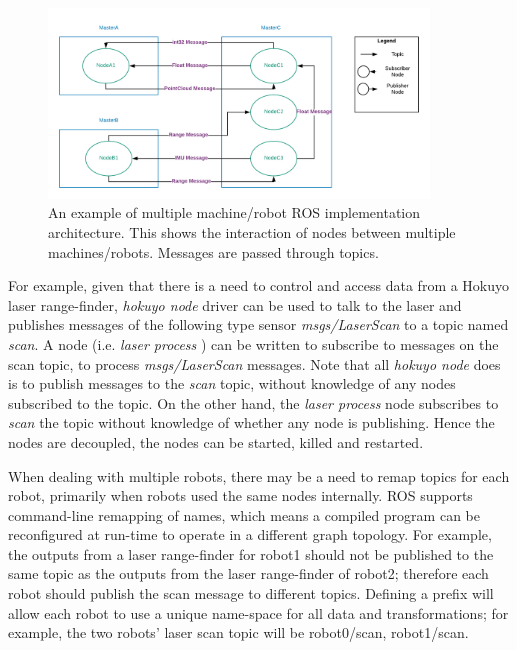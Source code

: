 \begin{figure}[H]
    \centering
    \includegraphics[width=0.9\textwidth]{figs/ros_master_nodes.png}
    \caption{An example of multiple machine/robot ROS implementation architecture. This shows the interaction of nodes between multiple machines/robots. Messages are passed through topics.}
    \label{fig:ros-master-nodes}
\end{figure}



For example, given that there is a need to control and access data from a Hokuyo laser range-finder, \textit{hokuyo node} driver can be used to talk to the laser and publishes messages of the following type sensor \textit{msgs/LaserScan} to a topic named \textit{scan}. A node (i.e. \textit{laser process} ) can be written to subscribe to messages on the scan topic, to process \textit{msgs/LaserScan} messages. Note that all \textit{hokuyo node} does is to publish messages to the \textit{scan} topic, without knowledge of any nodes subscribed to the topic. On the other hand, the \textit{laser process} node subscribes to \textit{scan} the topic without knowledge of whether any node is publishing. Hence the nodes are decoupled, the nodes can be started, killed and restarted. 

When dealing with multiple robots,  there may be a  need to remap topics for each robot, primarily when robots used the same nodes internally.  ROS supports command-line remapping of names,  which means a compiled program can be reconfigured at run-time to operate in a different graph topology.  For example, the outputs from a laser range-finder for robot1 should not be published to the same topic as the outputs from the laser range-finder of robot2; therefore each robot should publish the scan message to different topics.  Defining a prefix will allow each robot to use a unique name-space for all data and transformations; for example, the two robots' laser scan topic will be robot0/scan, robot1/scan.

